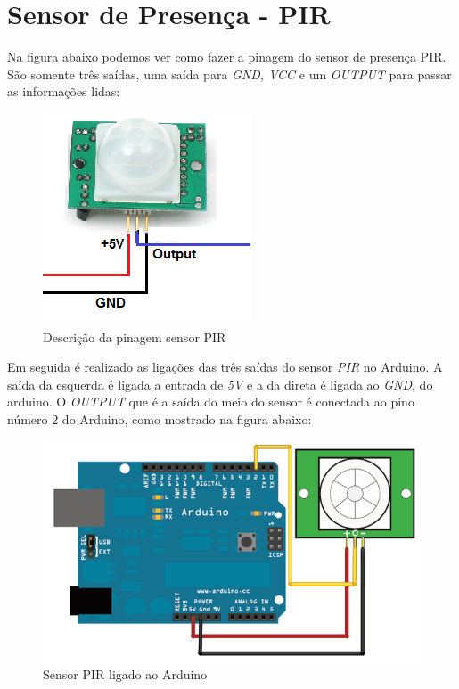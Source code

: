 \documentclass[13pt,a4]{article}
\begin{document}
\section{Sensor de Presença - PIR} 	

	Na figura abaixo podemos ver como fazer a pinagem do sensor de presença PIR. São somente três saídas, uma saída para \textit{ GND, VCC} e um \textit{OUTPUT} para passar as informações lidas: 
\begin{figure}[!htb]
	\centering
	\includegraphics[scale=0.55]{PIRpin.png}
	\caption{ Descrição da pinagem sensor PIR	}
	\label{}
\end{figure}

	Em seguida é realizado as ligações das três saídas do sensor \textit{PIR} no Arduino. A saída da esquerda é ligada a entrada de \textit{5V} e a da direta é ligada ao \textit{GND}, do arduino. O \textit{OUTPUT} que é a saída do meio do sensor é conectada ao pino número 2 do Arduino, como mostrado na figura abaixo:

\begin{figure}[!htb]
	\centering
	\includegraphics[scale=0.45]{pir2.png}
	\caption{Sensor PIR ligado ao Arduino}
	\label{}
\end{figure}
\end{document}
